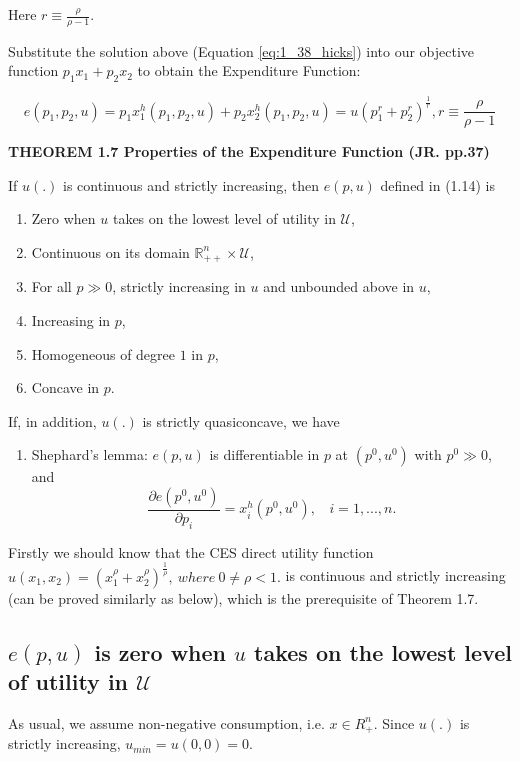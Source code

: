 \documentclass{article}
\newcommand{\R}{\mathbb{R}}
\begin{document}
\begin{mdframed}[backgroundcolor=blue!20,linecolor=white]
Here $r \equiv \frac{\rho}{\rho - 1}$.

Substitute the solution above (Equation \ref{eq:1_38_hicks}) into our
objective function  $p_1x_1 + p_2x_2$ to obtain the Expenditure Function:

$$e(p_1,p_2, u) = p_1x_1^h(p_1,p_2,u) + p_2x_2^h(p_1,p_2,u) = 
u(p_1^{r} + p_2^{r})^{\frac{1}{r}} , r \equiv \frac{\rho}{\rho - 1}$$

\textbf{THEOREM 1.7 Properties of the Expenditure Function (JR. pp.37)}

\medskip

If $u(.)$ is continuous and strictly increasing, then $e(p, u)$ defined in (1.14) is

\begin{enumerate}
\item Zero when $u$ takes on the lowest level of utility in $\mathcal{U}$,
\item Continuous on its domain $\R^n_{++} \times \mathcal{U}$,
\item For all $p \gg 0$, strictly increasing in $u$ and unbounded above in $u$,
\item Increasing in $p$,
\item Homogeneous of degree $1$ in $p$,
\item Concave in $p$.
\end{enumerate}
If, in addition, $u(.)$ is strictly quasiconcave, we have
\begin{enumerate}[start = 7]
\item Shephard’s lemma: $e(p, u)$ is differentiable in $p$ at $(p^0, u^0)$ with $p^0 \gg 0$, and
$$\frac{\partial e(p^0, u^0)}{\partial p_i} = x^h_i (p^0, u^0), \ \ \ \ i = 1, . . . , n.$$
\end{enumerate}
\end{mdframed}

Firstly we should know that the CES direct utility function $u(x_1, x_2) = (x_1^{\rho} + x_2^{\rho})^{\frac{1}{\rho}},\ where \ 0 \ne \rho<1.$ is continuous and strictly increasing (can be proved similarly as below), which is the
prerequisite of Theorem 1.7.

\subsection{$e(p, u)$ is zero when $u$ takes on the lowest level of utility in $\mathcal{U}$}

As usual, we assume non-negative consumption, i.e. $x \in R^n_+$. Since $u(.)$ is strictly increasing,
$u_{min} = u(0,0) = 0$. 
\end{document}
